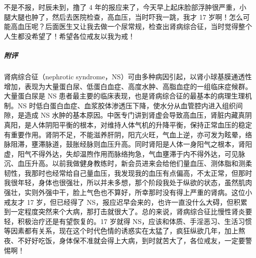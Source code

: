 \begin{case}
    不是不报，时辰未到，撸了 4 年的报应来了，今天早上起床脸部浮肿很严重，小腿大腿也肿了，然后去医院检查，高血压，当时吓我一跳，我才 17 岁啊！怎么可能高血压呢？后面医生又让我去做一个尿常规，检查出肾病综合征，当时觉得整个人生都没希望了！希望各位戒友以我为戒！
    \subparagraph{附评} 肾病综合征（nephrotic syndrome，NS）可由多种病因引起，以肾小球基膜通透性增加，表现为大量蛋白尿、低蛋白血症、高度水肿、高脂血症的一组临床症候群。大量蛋白尿是 NS 患者最主要的临床表现，也是肾病综合征的最基本的病理生理机制。NS 时低白蛋白血症、血浆胶体渗透压下降，使水分从血管腔内进入组织间隙，是造成 NS 水肿的基本原因。中医专门讲到肾虚会导致高血压，肾脏内藏真阴真阳，是人体阴阳平衡的根本，对维持人体气机的升降平衡，保持正常血压的稳定有重要作用。肾阴不足，不能滋养肝阴，阳亢火旺，气血上逆，亦可发为眩晕，络脉阻滞，壅滞脉道，鼓胀经脉则血压升高。同时肾阳是人体一身阳气之根本，肾阳虚，阳气不得外达，失却温煦作用而脉络拘急，气血壅滞于内不得外达，可见脉沉、血压升高。以前我做健身教练时，新会员进来会给他们量血压、测体脂和测柔韧性，我那时也经常给自己量血压，我发现我的血压有点偏高，不太正常，但那时我很年轻，身体也很强壮，所以并未多想，那个阶段我处于纵欲的状态，虽然肌肉强壮，实则外强中干，脸上气色也不算好，所幸那时没有得上严重的肾病。这位小戒友才 17 岁，但已经得了 NS，报应迟早会来的，也许一直没什么大碍，但积累到一定程度突然来个大病，那打击就很大了。总的来说，肾病综合征比慢性肾炎要轻，积极治疗还是有望恢复的。17 岁就得 NS，应该和体质、手淫恶习、生活习惯等因素都有关系，现在这个时代色情的诱惑实在太猛了，疯狂纵欲几年，加上熬夜、不好好吃饭，身体保不准就会得上大病，到时就苦大了，各位戒友，一定要警惕啊！
\end{case}


